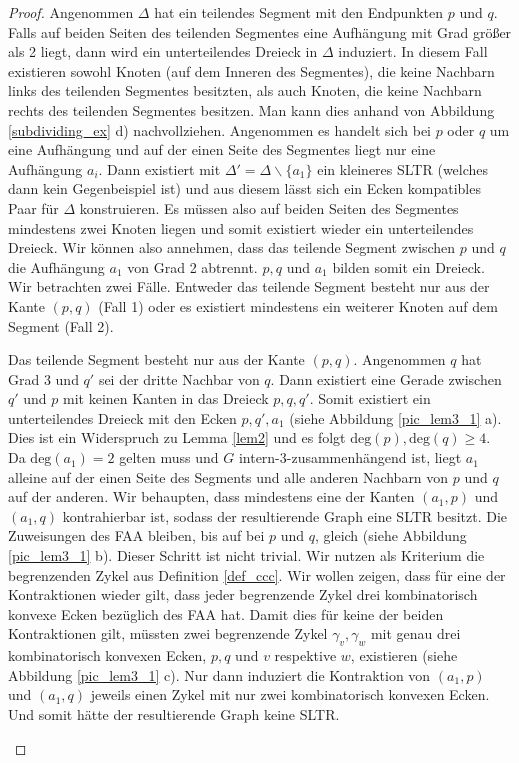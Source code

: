 \begin{proof}
Angenommen $\Delta$ hat ein teilendes Segment mit den Endpunkten $p$ und $q$. Falls auf beiden Seiten des teilenden Segmentes eine Aufhängung mit Grad größer als 2 liegt, dann wird ein unterteilendes Dreieck in $\Delta$ induziert. In diesem Fall existieren sowohl Knoten (auf dem Inneren des Segmentes), die keine Nachbarn links des teilenden Segmentes besitzten, als auch Knoten, die keine Nachbarn rechts des teilenden Segmentes besitzen. Man kann dies anhand von Abbildung \ref{subdividing_ex} d) nachvollziehen. Angenommen es handelt sich bei $p$ oder $q$ um eine Aufhängung und auf der einen Seite des Segmentes liegt nur eine Aufhängung $a_i$. Dann existiert mit $\Delta' = \Delta \backslash \{a_1\}$ ein kleineres SLTR (welches dann kein Gegenbeispiel ist) und aus diesem lässt sich ein Ecken kompatibles Paar für $\Delta$ konstruieren. Es müssen also auf beiden Seiten des Segmentes mindestens zwei Knoten liegen und somit existiert wieder ein unterteilendes Dreieck. Wir können also annehmen, dass das teilende Segment zwischen $p$ und $q$ die Aufhängung $a_1$ von Grad 2 abtrennt. $p,q$ und $a_1$ bilden somit ein Dreieck. Wir betrachten zwei Fälle. Entweder das teilende Segment besteht nur aus der Kante $(p,q)$ (Fall 1) oder es existiert mindestens ein weiterer Knoten auf dem Segment (Fall 2).

\begin{description}[leftmargin =0pt, font = \rmfamily,listparindent=\parindent,parsep=0pt]
\item[Fall 1:] Das teilende Segment besteht nur aus der Kante $(p,q)$. Angenommen $q$ hat Grad 3 und $q'$ sei der dritte Nachbar von $q$. Dann existiert eine Gerade zwischen $q'$ und $p$ mit keinen Kanten in das Dreieck $p,q,q'$. Somit existiert ein unterteilendes Dreieck mit den Ecken $p,q',a_1$ (siehe Abbildung \ref{pic_lem3_1} a). Dies ist ein Widerspruch zu Lemma \ref{lem2} und es folgt $\text{deg}(p),\text{deg}(q) \geq 4$. Da $\text{deg}(a_1) = 2$ gelten muss und $G$ intern-3-zusammenhängend ist, liegt $a_1$ alleine auf der einen Seite des Segments und alle anderen Nachbarn von $p$ und $q$ auf der anderen. 
Wir behaupten, dass mindestens eine der Kanten $(a_1,p)$ und $(a_1,q)$ kontrahierbar ist, sodass der resultierende Graph eine SLTR besitzt. Die Zuweisungen des FAA bleiben, bis auf bei $p$ und $q$, gleich (siehe Abbildung \ref{pic_lem3_1} b). Dieser Schritt ist nicht trivial. Wir nutzen als Kriterium die begrenzenden Zykel aus Definition \ref{def_ccc}. Wir wollen zeigen, dass für eine der Kontraktionen wieder gilt, dass jeder begrenzende Zykel drei kombinatorisch konvexe Ecken bezüglich des FAA hat. Damit dies für keine der beiden Kontraktionen gilt, müssten zwei begrenzende Zykel $\gamma_v,\gamma_w$ mit genau drei kombinatorisch konvexen Ecken, $p,q$ und $v$ respektive $w$, existieren (siehe Abbildung \ref{pic_lem3_1} c). Nur dann induziert die Kontraktion von $(a_1,p)$ und $(a_1,q)$ jeweils einen Zykel mit nur zwei kombinatorisch konvexen Ecken. Und somit hätte der resultierende Graph keine SLTR.


\end{description}
\end{proof}
